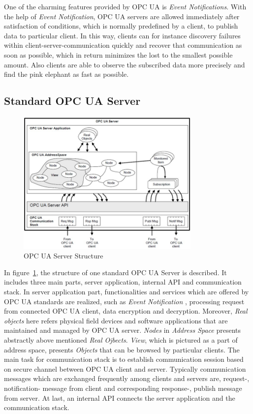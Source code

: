 One of the charming features provided by OPC UA is \emph{Event Notifications}. With the help of \emph{Event Notification}, OPC UA servers are allowed immediately after satisfaction of conditions, which is normally predefined by a client, to publish data to particular client. In this way, clients can for instance discovery failures within client-server-communication quickly and recover that communication as soon as possible, which in return minimizes the lost to the smallest possible amount. Also clients are able to observe the subscribed data more precisely and find the pink elephant as fast as possible.

\subsection{Standard OPC UA Server}
\begin{figure}[!htbp]
	\centering
	\includegraphics[width=0.8\textwidth]{server.jpg}
		\caption{OPC UA Server Structure\cite{O1}}
	\label{fig:server}
\end{figure}
In figure~\ref{fig:server}, the structure of one standard OPC UA Server is described. It includes three main parts, server application, internal API and communication stack. In server application part,  functionalities and services which are offered by OPC UA standards are realized, such as \emph{Event Notification} , processing request from connected OPC UA client, data encryption and decryption. Moreover, \emph{Real objects}  here  refers physical field devices and software applications that are maintained and managed by OPC UA server. \emph{Nodes} in \emph{Address Space} presents  abstractly above mentioned \emph{Real Ojbects}. \emph{View}, which is pictured as a part of address space, presents \emph{Objects} that can be browsed by particular clients. The main  task for communication stack  is to establish communication session based on secure channel between OPC UA client and server. Typically communication messages which are exchanged frequently among clients and servers are, request-, notification- message from client and   corresponding   response-, publish message from server. At last, an internal API connects the server application and the communication stack.

